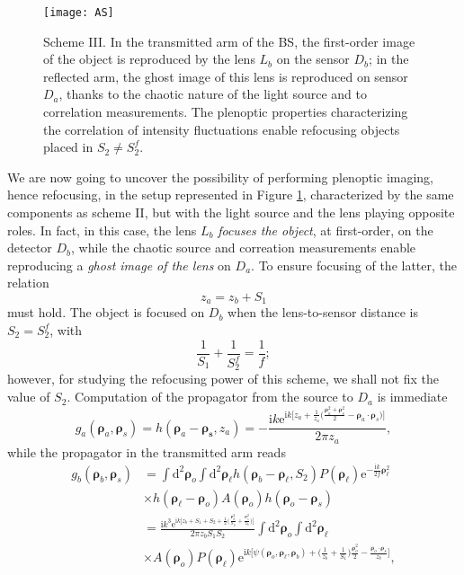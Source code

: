 \documentclass[aps,pra,amssymb,twocolumn,amsmath,superscriptaddress,showpacs,10pt]{revtex4-1}
\def\e{\mathrm{e}}
\def\d{\mathrm{d}}
\def\i{\mathrm{i}}
\begin{document}
\begin{figure}
\centering
\texttt{[image: AS]}
\caption{\small Scheme III. In the transmitted arm of the BS, the first-order image of the object is reproduced by the lens $L_b$  on the sensor $D_b$; in the reflected arm, the ghost image of this lens is reproduced on sensor $D_a$, thanks to the chaotic nature of the light source and to correlation measurements. The plenoptic properties characterizing the correlation of intensity fluctuations enable refocusing objects placed in $S_2\neq S_2^f$. }\label{fig.PCI2}
\end{figure}

We are now going to uncover the possibility of performing plenoptic imaging, hence refocusing, in the setup represented in Figure \ref{fig.PCI2}, characterized by the same components as scheme II, but with the light source and the lens playing opposite roles. In fact, in this case, the lens $L_b$ \textit{focuses the object}, at first-order, on the detector $D_b$, while the chaotic source and correation measurements enable reproducing a \textit{ghost image of the lens} on $D_a$. To ensure focusing of the latter, the relation
\begin{equation}\label{focusingthird}
z_a=z_b+S_1
\end{equation}
must hold. The object is focused on $D_b$ when the lens-to-sensor distance is $S_2=S_2^f$, with
\begin{equation}
\frac{1}{S_1}+\frac{1}{S_2^f} = \frac{1}{f};
\end{equation}
however, for studying the refocusing power of this scheme, we shall not fix the value of $S_2$. Computation of the propagator from the source to $D_a$ is immediate
\begin{equation}
g_a(\bm{\rho}_a,\bm{\rho}_s) = h(\bm{\rho}_a-\bm{\rho_s},z_a) = -\frac{\i k \e^{\i k \bigl[ z_a + \frac{1}{z_a}\bigl(\frac{\bm{\rho}_a^2+\bm{\rho}_s^2}{2} - \bm{\rho}_a\cdot\bm{\rho}_s \bigr)\bigr]} }{2\pi z_a}  ,
\end{equation}
while the propagator in the transmitted arm reads
\begin{align}
g_b(\bm{\rho}_b,\bm{\rho}_s) & \!=\! \int\!\d^2\!\bm{\rho}_o\! \int\!\d^2\!\bm{\rho}_{\ell} h(\bm{\rho}_b-\bm{\rho}_{\ell},S_2) P(\bm{\rho}_{\ell}) \e^{-\frac{\i k}{2 f}\bm{\rho}_{\ell}^2} \nonumber \\
& \times h(\bm{\rho}_{\ell}-\bm{\rho}_o) A(\bm{\rho}_o) h(\bm{\rho}_o-\bm{\rho}_s) \nonumber \\
& =  \frac{\i k^3 \e^{\i k \bigl[ z_b+S_1+S_2 + \frac{1}{2}\bigl(\frac{\bm{\rho}_b^2}{S_2}+\frac{\bm{\rho}_s^2}{z_b} \bigr) \bigr]} }{2\pi z_b S_1 S_2} \! \int\!\d^2\!\bm{\rho}_o\! \int\!\d^2\!\bm{\rho}_{\ell} \nonumber \\
& \times A(\bm{\rho}_o) P(\bm{\rho}_{\ell})  \e^{\i k \bigl[ \psi(\bm{\rho}_o,\bm{\rho}_{\ell},\bm{\rho}_b) + \bigl( \frac{1}{z_b}+\frac{1}{S_1} \bigr) \frac{\bm{\rho}_o^2}{2} - \frac{\bm{\rho}_o\cdot\bm{\rho}_s}{z_b} \bigr] } ,
\end{align}
\end{document}
